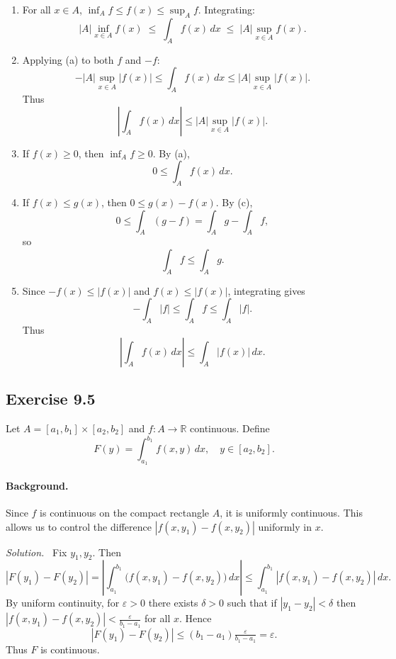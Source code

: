\documentclass[11pt,a4paper]{article}
\newenvironment{solution}{\par\noindent\textit{Solution.}\ }{\par\vspace{0.5em}}
\begin{document}
\begin{enumerate}[label=\alph*)]
	
	\item For all $x\in A$, $\inf_A f\leq f(x)\leq \sup_A f$.  
	Integrating:
	\[
	|A|\inf_{x\in A} f(x)\;\leq\;\int_A f(x)\,dx\;\leq\;|A|\sup_{x\in A} f(x).
	\]
	
	\item Applying (a) to both $f$ and $-f$:
	\[
	-|A|\sup_{x\in A}|f(x)|\leq \int_A f(x)\,dx \leq |A|\sup_{x\in A}|f(x)|.
	\]
	Thus
	\[
	\left|\int_A f(x)\,dx\right|\leq |A|\sup_{x\in A}|f(x)|.
	\]
	
	\item If $f(x)\geq 0$, then $\inf_A f\geq 0$. By (a),
	\[
	0\leq \int_A f(x)\,dx.
	\]
	
	\item If $f(x)\leq g(x)$, then $0\leq g(x)-f(x)$.  
	By (c),
	\[
	0\leq \int_A (g-f)=\int_A g-\int_A f,
	\]
	so
	\[
	\int_A f \leq \int_A g.
	\]
	
	\item Since $-f(x)\leq |f(x)|$ and $f(x)\leq |f(x)|$, integrating gives
	\[
	-\int_A |f|\leq \int_A f \leq \int_A |f|.
	\]
	Thus
	\[
	\left|\int_A f(x)\,dx\right|\leq \int_A |f(x)|\,dx.
	\]
	
\end{enumerate}

\subsection*{Exercise 9.5}

Let $A=[a_1,b_1]\times[a_2,b_2]$ and $f:A\to\mathbb{R}$ continuous. Define
\[
F(y)=\int_{a_1}^{b_1} f(x,y)\,dx, \quad y\in[a_2,b_2].
\]

\paragraph{Background.}
Since $f$ is continuous on the compact rectangle $A$, it is uniformly continuous. 
This allows us to control the difference $|f(x,y_1)-f(x,y_2)|$ uniformly in $x$.

\begin{solution}
	Fix $y_1,y_2$. Then
	\[
	|F(y_1)-F(y_2)|
	=\left|\int_{a_1}^{b_1}\big(f(x,y_1)-f(x,y_2)\big)\,dx\right|
	\leq \int_{a_1}^{b_1}|f(x,y_1)-f(x,y_2)|\,dx.
	\]
	By uniform continuity, for $\varepsilon>0$ there exists $\delta>0$ such that if $|y_1-y_2|<\delta$ then 
	$|f(x,y_1)-f(x,y_2)|<\tfrac{\varepsilon}{b_1-a_1}$ for all $x$.  
	Hence
	\[
	|F(y_1)-F(y_2)|\leq (b_1-a_1)\tfrac{\varepsilon}{b_1-a_1}=\varepsilon.
	\]
	Thus $F$ is continuous.
\end{solution}
\end{document}
